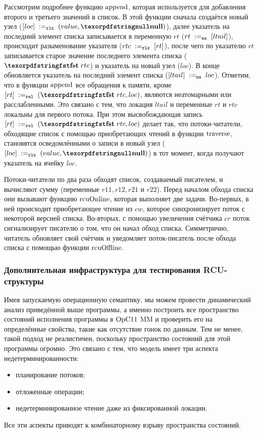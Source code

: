 Рассмотрим подробнее функцию ${\rm append}$, которая используется для добавления второго и третьего значений в список.
В этой функции сначала создаётся новый узел ($\writeInstParam{\rlx}{loc}{(value, \nullPtr)}$),
далее указатель на последний элемент списка записывается в переменную $rt$ ($rt \;:=_{\mathtt{na}}\;[ltail]$),
происходит разыменование указателя ($rtc \;:=_{\mathtt{rlx}}\;[rt]$),
после чего по указателю $rt$ записывается старое значение последнего элемента списка ($\kw{fst} \; rtc$)
и указатель на новый узел ($loc$).
В конце обновляется указатель на последний элемент списка ($[ltail] \;:=_{\mathtt{na}}\;loc$).
Отметим, что в функции ${\rm append}$ все обращения к памяти, кроме $\writeInstParam{\rel}{rt}{(\kw{fst} \; rtc, loc)}$,
являются неатомарными или расслабленными. Это связано с тем, что локация $ltail$ и переменные $rt$ и $rtc$ локальны
для первого потока. При этом высвобождающая запись $\writeInstParam{\rel}{rt}{(\kw{fst} \; rtc, loc)}$
делает так, что потоки-читатели, обходящие список с помощью приобретающих чтений в функции ${\rm traverse}$,
становятся осведомлёнными о записи в новый узел ($\writeInstParam{\rlx}{loc}{(value, \nullPtr)}$) в тот момент,
когда получают указатель на ячейку $loc$.

Потоки-читатели по два раза обходят список, создаваемый писателем, и вычисляют сумму (переменные $r11, r12, r21$ и $r22$).
Перед началом обхода списка они вызывают функцию ${\rm rcuOnline}$,
которая выполняет две задачи. Во-первых, в ней происходит приобретающее чтение из $cw$, которое синхронизирует
поток с некоторой версией списка. Во-вторых, с помощью увеличения счётчика $cr$ поток сигнализирует писателю о том,
что он начал обход списка.
Симметрично, читатель обновляет свой счётчик и уведомляет поток-писатель после обхода списка с помощью функции ${\rm rcuOffline}$.

\subsubsection{Дополнительная инфраструктура для тестирования RCU-структуры}
Имея запускаемую операционную семантику, мы можем провести динамический анализ приведённой выше программы,
а именно построить все пространство состояний исполнения программы в $\mathrm{OpC11}$ MM и проверить его на
определённые свойства, такие как отсутствие гонок по данным.
Тем не менее, такой подход не реалистичен, поскольку пространство состояний для этой программы огромно.
Это связано с тем, что модель имеет три аспекта недетерминированности:
\begin{itemize}
  \item планирование потоков;
  \item отложенные операции;
  \item недетерминированное чтение даже из фиксированной локации.
\end{itemize}
Все эти аспекты приводят к комбинаторному взрыву пространства состояний.

